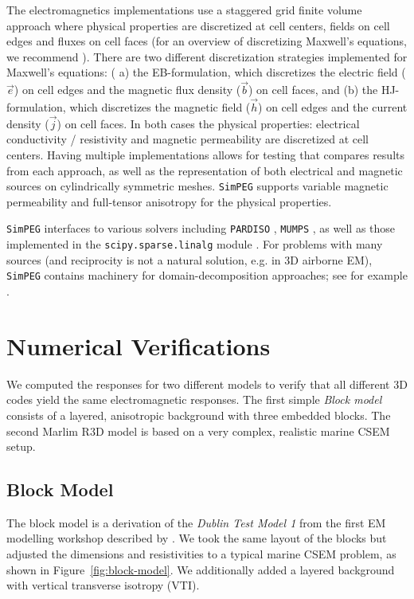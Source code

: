 \documentclass[
    paper,
  ]{geophysics}
\newcommand{\simpeg}{\texttt{SimPEG}\xspace}
\begin{document}
The electromagnetics implementations use a staggered grid finite volume
approach where physical properties are discretized at cell centers, fields on
cell edges and fluxes on cell faces \citep{IEEE.66.Yee} (for an overview of
discretizing Maxwell's equations, we recommend \cite{B.SIAM.14.Haber}). There are
two different discretization strategies implemented for Maxwell's equations: (
a) the EB-formulation, which discretizes the electric field ($\vec{e}$) on
cell edges and the magnetic flux density ($\vec{b}$) on cell faces, and (b)
the HJ-formulation, which discretizes the magnetic field ($\vec{h}$) on cell
edges and the current density ($\vec{j}$) on cell faces. In both cases the
physical properties: electrical conductivity / resistivity and magnetic
permeability are discretized at cell centers. Having multiple implementations
allows for testing that compares results from each approach, as well as the
representation of both electrical and magnetic sources on cylindrically
symmetric meshes. \simpeg supports variable magnetic permeability and
full-tensor anisotropy for the physical properties.


\simpeg interfaces to various solvers including \texttt{PARDISO}
\citep{FGCS.04.Schenk}, \texttt{MUMPS} \citep{SIAM.01.Amestoy}, as well as
those implemented in the \texttt{scipy.sparse.linalg} module
\citep{NM.20.Virtanen}. For problems with many sources (and reciprocity is not
a natural solution, e.g. in 3D airborne EM), \simpeg contains machinery for
domain-decomposition approaches; see for example \cite{GEO.20.Fournier}.


\section{Numerical Verifications}

We computed the responses for two different models to verify that all different
3D codes yield the same electromagnetic responses. The first simple \emph{Block
model} consists of a layered, anisotropic background with three embedded
blocks. The second Marlim R3D model is based on a very complex, realistic
marine CSEM setup.

\subsection{Block Model}

The block model is a derivation of the \emph{Dublin Test Model 1} from the
first EM modelling workshop described by \cite{GJI.13.Miensopust}. We took the
same layout of the blocks but adjusted the dimensions and resistivities to a
typical marine CSEM problem, as shown in Figure~\ref{fig:block-model}. We
additionally added a layered background with vertical transverse isotropy
(VTI).
%
%
\end{document}
